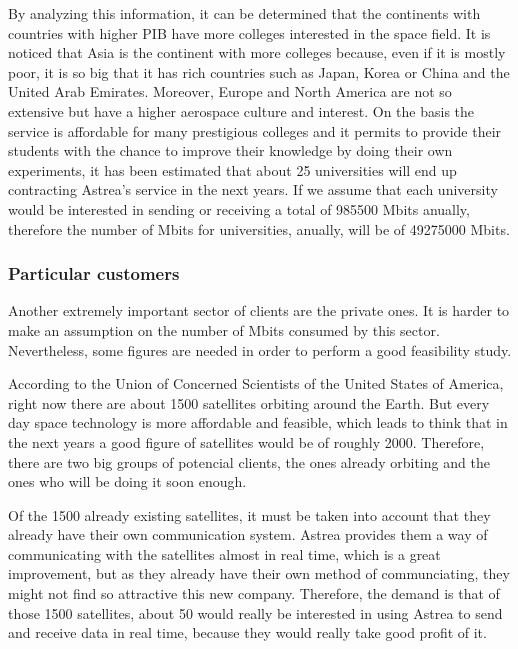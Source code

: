 By analyzing this information, it can be determined that the continents with countries with higher PIB have more colleges interested in the space field. It is noticed that Asia is the continent with more colleges because, even if it is mostly poor, it is so big that it has rich countries such as Japan, Korea or China and the United Arab Emirates. Moreover, Europe and North America are not so extensive but have a higher aerospace culture and interest. 
\newline
\newline
On the basis the service is affordable for many prestigious colleges and it permits to provide their students with the chance to improve their knowledge by doing their own experiments, it has been estimated that about 25 universities will end up contracting Astrea's service in the next years. If we assume that each university would be interested in sending or receiving a total of 985500 Mbits anually, therefore the number of Mbits for universities, anually, will be of 49275000 Mbits.

\subsubsection{Particular customers}
Another extremely important sector of clients are the private ones. It is harder to make an assumption on the number of Mbits consumed by this sector. Nevertheless, some figures are needed in order to perform a good feasibility study. 

According to the Union of Concerned Scientists of the United States of America, right now there are about 1500 satellites orbiting around the Earth. But every day space technology is more affordable and feasible, which leads to think that in the next years a good figure of satellites would be of roughly 2000. Therefore, there are two big groups of potencial clients, the ones already orbiting and the ones who will be doing it soon enough.

Of the 1500 already existing satellites, it must be taken into account that they already have their own communication system. Astrea provides them a way of communicating with the satellites almost in real time, which is a great improvement, but as they already have their own method of communciating, they might not find so attractive this new company. Therefore, the demand is that of those 1500 satellites, about 50 would really be interested in using Astrea to send and receive data in real time, because they would really take good profit of it.

